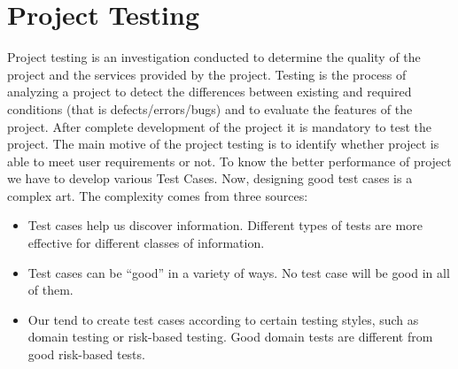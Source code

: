 \section{Project Testing}
Project testing is an investigation conducted to determine the quality of the project and the services
provided by the project. Testing is the process of analyzing a project to detect the differences between
existing and required conditions (that is defects/errors/bugs) and to evaluate the features of the project.
After complete development of the project it is mandatory to test the project.
The main motive of the project testing is to identify whether project is able to meet user requirements or
not. To know the better performance of project we have to develop various Test Cases. Now, designing
good test cases is a complex art. The complexity comes from three sources:
\begin{itemize}
\item Test cases help us discover information. Different types of tests are more effective for
different classes of information.
\item Test cases can be “good” in a variety of ways. No test case will be good in all of them.
\item Our tend to create test cases according to certain testing styles, such as domain testing or
risk-based testing. Good domain tests are different from good risk-based tests.
\end{itemize} 
